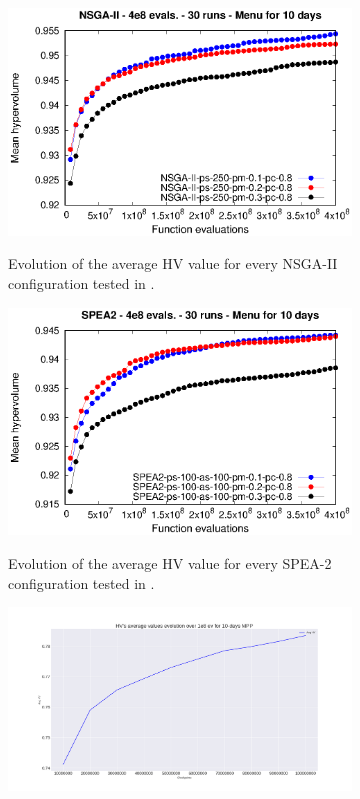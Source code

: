 \begin{figure}[H]
\begin{subfigure}{.5\textwidth}
  \centering
  \includegraphics[width=1.0\linewidth]{../references/meanHV_Evolution_NSGA2_days_10.eps}
  \label{fig:sfig1}
    \caption{Evolution of the average HV value for every NSGA-II configuration tested in \cite{Miranda2018}.}
\end{subfigure}%
\begin{subfigure}{.5\textwidth}
  \centering
  \includegraphics[width=1.0\linewidth]{../references/meanHV_Evolution_SPEA2_days_10.eps}
  \label{fig:sfig2}
  \caption{Evolution of the average HV value for every SPEA-2 configuration tested in \cite{Miranda2018}.}
\end{subfigure}
\centering
\begin{subfigure}{.9\textwidth}
  \centering
  \includegraphics[width=1.0\linewidth]{../experiments/plots/avgHV_evolution_10_days.png}

\end{subfigure}
\end{figure}

